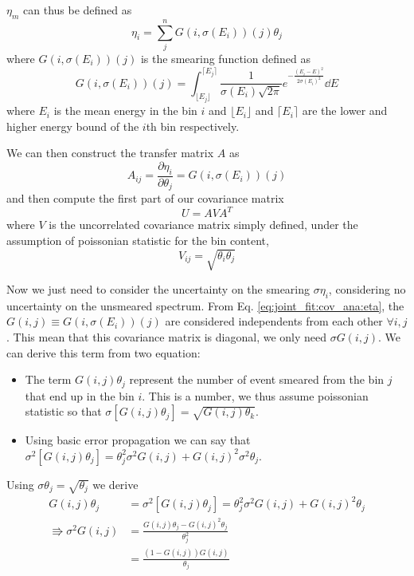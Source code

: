 \documentclass[../main.tex]{subfiles}
\begin{document}
$\eta_m$ can thus be defined as
\begin{equation}
  \label{eq:joint_fit:cov_ana:eta}
  \eta_i  = \sum_j^n G(i, \sigma(E_i))(j) \theta_j
\end{equation}
where $G(i, \sigma(E_i))(j)$ is the smearing function defined as
\begin{equation}
  G(i, \sigma(E_i))(j) = \int_{\lfloor E_j\rfloor}^{\lceil E_j \rceil} \frac{1}{\sigma(E_i)\sqrt{2\pi}} e^{-\frac{(E_i-E)^2}{2\sigma(E_i)^2}} \dd{E}
\end{equation}
where $E_i$ is the mean energy in the bin $i$ and $\lfloor E_i\rfloor$ and $\lceil E_i \rceil$ are the lower and higher energy bound of the $i$th bin respectively.

We can then construct the transfer matrix $A$ as
\begin{equation}
  A_{ij} = \frac{\partial\eta_i}{\partial\theta_j} = G(i, \sigma(E_i))(j)
\end{equation}
and then compute the first part of our covariance matrix
\begin{equation}
  U = AVA^T
\end{equation}
where $V$ is the uncorrelated covariance matrix simply defined, under the assumption of poissonian statistic for the bin content,
\begin{equation}
  V_{ij} = \sqrt{\theta_i \theta_j}
\end{equation}

Now we just need to consider the uncertainty on the smearing $\sigma \eta_i$, considering no uncertainty on the unsmeared spectrum. From Eq. \ref{eq:joint_fit:cov_ana:eta}, the $G(i, j) \equiv G(i, \sigma(E_i))(j)$ are considered independents from each other $\forall i, j$. This mean that this covariance matrix is diagonal, we only need $\sigma G(i, j)$. We can derive this term from two equation:
\begin{itemize}
  \item The term $G(i, j)\theta_j$ represent the number of event smeared from the bin $j$ that end up in the bin $i$. This is a number, we thus assume poissonian statistic so that $\sigma[G(i, j)\theta_j] = \sqrt{G(i, j) \theta_k}$.
  \item Using basic error propagation we can say that $\sigma^2[G(i, j)\theta_j] =\theta_j^2 \sigma^2G(i, j) + G(i, j)^2 \sigma^2 \theta_j$.
\end{itemize}
Using $\sigma\theta_j = \sqrt{\theta_j}$ we derive
\begin{align}
  G(i, j) \theta_j &= \sigma^2[G(i, j)\theta_j] =\theta_j^2 \sigma^2G(i, j) + G(i, j)^2 \theta_j \\
  \Rrightarrow \sigma^2 G(i, j) &= \frac{G(i, j) \theta_j - G(i, j)^2 \theta_j}{\theta_j^2} \\
                                &= \frac{(1 - G(i, j))G(i, j)}{\theta_j}
\end{align}
\end{document}
